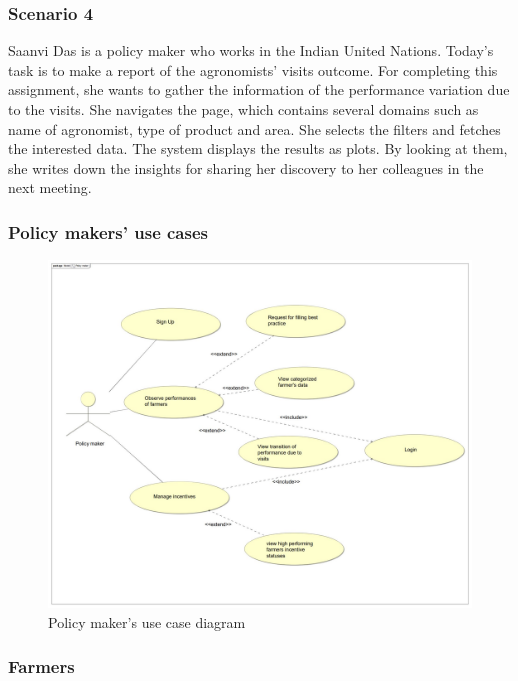 \subsubsection*{Scenario 4}
Saanvi Das is a policy maker who works in the Indian United Nations. Today's task is to make a report of the agronomists' visits outcome. For completing this assignment, she wants to gather the information of the performance variation due to the visits. She navigates the page, which contains several domains such as name of agronomist, type of product and area. She selects the filters and fetches the interested data. The system displays the results as plots. By looking at them, she writes down the insights for sharing her discovery to her colleagues in the next meeting.


\subsubsection*{Policy makers' use cases}
\begin{figure}[H]
	\centering
    \includegraphics[width=\textwidth]{Images/ud_policy.JPG}

	\caption{\label{fig:pm_use_case_diagram}Policy maker's use case diagram}

\end{figure}
\label{sect:policy_maker_requirements}




\subsubsection{Farmers}
